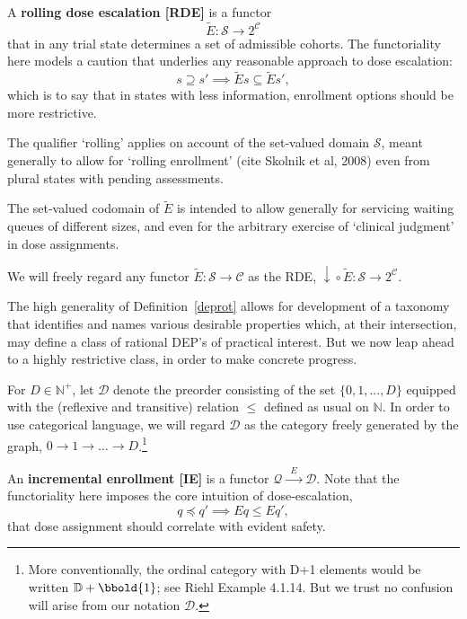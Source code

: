\documentclass{article}
\newcommand{\N}{\mathbb{N}}
\renewcommand{\S}{\ensuremath{\mathcal{S}}} %
\newcommand{\C}{\ensuremath{\mathcal{C}}}
\newcommand{\D}{\ensuremath{\mathcal{D}}}
\newcommand{\Q}{\ensuremath{\mathcal{Q}}}
\begin{document}
\begin{defn}\label{deprot}
  A \textbf{rolling dose escalation [RDE]} is a functor
  $$
  \widetilde{E} : \S \rightarrow 2^\C
  $$
  that in any trial state determines a set of admissible cohorts.  The functoriality here models a caution that underlies any reasonable approach to dose escalation:
  $$
  s \supseteq s' \implies \widetilde{E} s \subseteq \widetilde{E} s',
  $$
  which is to say that in states with less information, enrollment options should be more restrictive.

  The qualifier `rolling' applies on account of the set-valued domain $\S$, meant generally to allow for `rolling enrollment' (cite Skolnik et al, 2008) even from plural states with pending assessments.
  
  The set-valued codomain of $\widetilde{E}$ is intended to allow generally for servicing waiting queues of different sizes, and even for the arbitrary exercise of `clinical judgment' in dose assignments.

  We will freely regard any functor $\widetilde{E} : \S \rightarrow \C$ as the RDE, $\downarrow\!\circ \widetilde{E} : \S \rightarrow 2^\C$.
\end{defn}

The high generality of Definition~\ref{deprot} allows for development of a taxonomy that identifies and names various desirable properties which, at their intersection, may define a class of rational DEP's of practical interest.  But we now leap ahead to a highly restrictive class, in order to make concrete progress.

\begin{nota}
  For $D \in \N^+$, let $\D$ denote the preorder consisting of the set $\{0, 1, ..., D\}$ equipped with the (reflexive and transitive) relation $\le$ defined as usual on $\N$.  In order to use categorical language, we will regard $\D$ as the category freely generated by the graph, $0 \rightarrow 1 \rightarrow \dots \rightarrow D$.\footnote{More conventionally, the ordinal category with D+1 elements would be written $\mathbb{D}+\bbold{1}$; see Riehl Example 4.1.14.  But we trust no confusion will arise from our notation $\D$.}
\end{nota}

\begin{defn}
  An \textbf{incremental enrollment [IE]} is a functor $\Q \xrightarrow{\;\;E\;\;} \D$.  Note that the functoriality here imposes the core intuition of dose-escalation,
  $$
  q \preceq q' \implies E q \le E q',
  $$
  that dose assignment should correlate with evident safety.
\end{defn}
\end{document}
